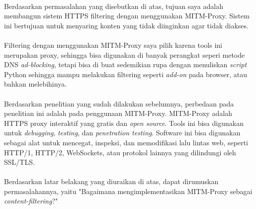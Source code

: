 \documentclass[a4paper,12pt]{article}
\newcommand{\bagian}[1]{\flushleft{\section{#1}}}
\begin{document}
  \paragraph*{}Berdasarkan permasalahan yang disebutkan
  di atas, tujuan saya adalah membangun sistem HTTPS
  filtering dengan menggunakan MITM-Proxy. Sistem ini
  bertujuan untuk menyaring konten yang tidak diinginkan
  agar tidak diakses.

  \paragraph*{}Filtering dengan menggunakan MITM-Proxy saya
  pilih karena tools ini merupakan proxy, sehingga bisa
  digunakan di banyak perangkat seperi metode DNS
  \textit{ad-blocking}, tetapi bisa di buat sedemikian rupa
  dengan menuliskan \textit{script} Python sehingga mampu
  melakukan filtering seperti \textit{add-on} pada browser,
  atau bahkan melebihinya.

  \paragraph*{}Berdasarkan penelitian yang sudah dilakukan
  sebelumnya, perbedaan pada penelitian ini adalah pada
  penggunaan MITM-Proxy. MITM-Proxy adalah HTTPS proxy
  interaktif yang gratis dan \textit{open source}. Tools ini
  bisa digunakan untuk \textit{debugging}, \textit{testing},
  dan \textit{penetration testing}. Software ini bisa
  digunakan sebagai alat untuk mencegat, inspeksi, dan
  memodifikasi lalu lintas web, seperti HTTP/1, HTTP/2,
  WebSockets, atau protokol lainnya yang dilindungi oleh
  SSL/TLS.

  \bagian{Rumusan Masalah}
  \paragraph*{}Berdasarkan latar belakang yang diuraikan di atas, dapat
  dirumuskan permasalahannya, yaitu "Bagaimana
  mengimplementasikan MITM-Proxy sebagai
  \textit{content-filtering}?"

  \printbibliography[title=Daftar Pustaka]
\end{document}

